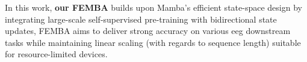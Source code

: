 In this work, \textbf{our FEMBA} builds upon Mamba’s efficient state-space design by integrating large-scale self-supervised pre-training with bidirectional state updates, FEMBA aims to deliver strong accuracy on various \gls{eeg} downstream tasks while maintaining linear scaling (with regards to sequence length) suitable for resource-limited devices.
